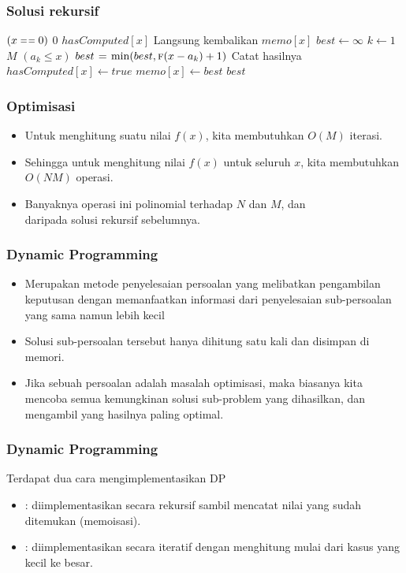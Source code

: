 \begin{frame}
\frametitle{Solusi rekursif}
\begin{codebox}
\li \If $(x \isequal 0)$ \Then
\li   \Return $0$
\li \ElseIf $hasComputed[x]$ \Then
\li   \Comment Langsung kembalikan
\li   \Return $memo[x]$ 
\li \Else
\li   $best \gets \infty$
\li   \For $k \gets 1$ \To $M$ \Do
\li     \If $(a_k \leq x)$ \Then
\li       $best \mathrel{\hspace{1pt}=\hspace{1pt}} \min(best, \textnormal{\scshape f}(x - a_k) + 1)$
        \End
      \End
\li   \Comment Catat hasilnya      
\li   $hasComputed[x] \gets true$
\li   $memo[x] \gets best$
\li   \Return $best$
    \End
\end{codebox}
\end{frame}

\begin{frame}
\frametitle{Optimisasi}
\begin{itemize}
  \item Untuk menghitung suatu nilai $f(x)$, kita membutuhkan $O(M)$ iterasi.
  \item Sehingga untuk menghitung nilai $f(x)$ untuk seluruh $x$, kita membutuhkan $O(NM)$ operasi.
  \item Banyaknya operasi ini polinomial terhadap $N$ dan $M$, dan \\  daripada solusi rekursif sebelumnya.
\end{itemize}
\end{frame}

\begin{frame} 
\frametitle{Dynamic Programming}
\begin{itemize}
  \item Merupakan metode penyelesaian persoalan yang melibatkan pengambilan keputusan dengan memanfaatkan informasi dari penyelesaian sub-persoalan yang sama namun lebih kecil
  \item Solusi sub-persoalan tersebut hanya dihitung satu kali dan disimpan di memori.
  \item Jika sebuah persoalan adalah masalah optimisasi, maka biasanya kita mencoba semua kemungkinan solusi sub-problem yang dihasilkan, dan  mengambil yang hasilnya paling optimal. 
\end{itemize}
\end{frame}

\begin{frame} 
\frametitle{Dynamic Programming}
Terdapat dua cara mengimplementasikan DP
\begin{itemize}
  \item \newTerm{\fTopdown}: diimplementasikan secara rekursif sambil mencatat nilai yang sudah ditemukan (memoisasi).
  \item \newTerm{\fBottomup}: diimplementasikan secara iteratif dengan menghitung mulai dari kasus yang kecil ke besar.
  \newline
\end{itemize}
\end{frame}

